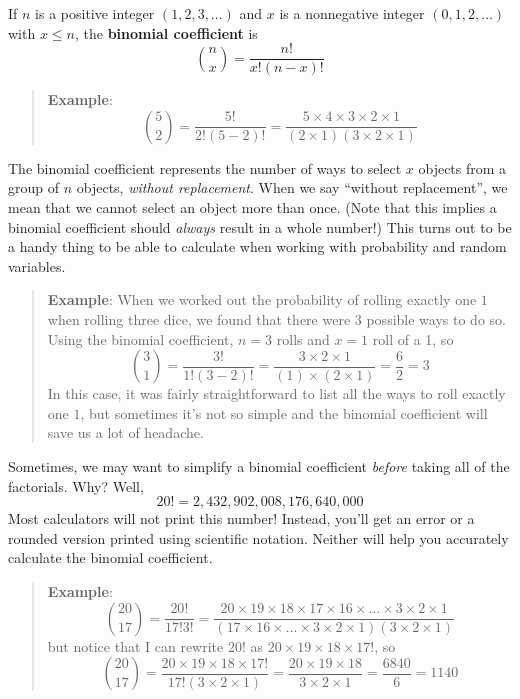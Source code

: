 \documentclass[
]{book}
\begin{document}
If \(n\) is a positive integer \((1, 2, 3, \dots)\) and \(x\) is a nonnegative integer \((0, 1, 2, \dots)\) with \(x \le n\), the \textbf{binomial coefficient} is \[\binom{n}{x} = \frac{n!}{x!(n-x)!}\]

\begin{quote}
\textbf{Example}: \[\binom{5}{2} = \frac{5!}{2!(5-2)!} = \frac{5 \times 4 \times 3 \times 2 \times 1}{(2 \times 1)(3 \times 2 \times 1)}\]
\end{quote}

The binomial coefficient represents the number of ways to select \(x\) objects from a group of \(n\) objects, \emph{without replacement}. When we say ``without replacement'', we mean that we cannot select an object more than once. (Note that this implies a binomial coefficient should \emph{always} result in a whole number!) This turns out to be a handy thing to be able to calculate when working with probability and random variables.

\begin{quote}
\textbf{Example}: When we worked out the probability of rolling exactly one \(1\) when rolling three dice, we found that there were \(3\) possible ways to do so. Using the binomial coefficient, \(n = 3\) rolls and \(x=1\) roll of a 1, so \[\binom{3}{1} = \frac{3!}{1!(3-2)!} = \frac{3 \times 2 \times 1}{(1) \times (2 \times 1)} = \frac{6}{2} = 3\]
In this case, it was fairly straightforward to list all the ways to roll exactly one \(1\), but sometimes it's not so simple and the binomial coefficient will save us a lot of headache.
\end{quote}

Sometimes, we may want to simplify a binomial coefficient \emph{before} taking all of the factorials. Why? Well, \[20! = 2,432,902,008,176,640,000\] Most calculators will not print this number! Instead, you'll get an error or a rounded version printed using scientific notation. Neither will help you accurately calculate the binomial coefficient.

\begin{quote}
\textbf{Example}: \[\binom{20}{17} = \frac{20!}{17!3!} = \frac{20\times 19\times 18\times 17\times 16\times \dots \times 3\times 2\times 1}{(17\times 16\times \dots \times 3\times 2\times 1)(3\times 2\times 1)}\] but notice that I can rewrite \(20!\) as \(20\times 19\times 18\times 17!\), so \[\binom{20}{17} = \frac{20\times 19\times 18\times 17!}{17!(3\times 2\times 1)} = \frac{20\times 19\times 18}{3\times 2\times 1} = \frac{6840}{6} = 1140\]
\end{quote}
\end{document}
